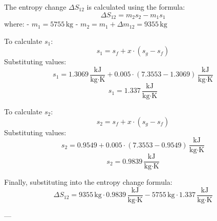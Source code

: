 The entropy change \( \Delta S_{12} \) is calculated using the formula:  
\[
\Delta S_{12} = m_{2} s_{2} - m_{1} s_{1}
\]  
where:  
- \( m_{1} = 5755 \, \text{kg} \)  
- \( m_{2} = m_{1} + \Delta m_{12} = 9355 \, \text{kg} \)  

To calculate \( s_{1} \):  
\[
s_{1} = s_f + x \cdot (s_g - s_f)
\]  
Substituting values:  
\[
s_{1} = 1.3069 \, \frac{\text{kJ}}{\text{kg·K}} + 0.005 \cdot (7.3553 - 1.3069) \, \frac{\text{kJ}}{\text{kg·K}}
\]  
\[
s_{1} = 1.337 \, \frac{\text{kJ}}{\text{kg·K}}
\]  

To calculate \( s_{2} \):  
\[
s_{2} = s_f + x \cdot (s_g - s_f)
\]  
Substituting values:  
\[
s_{2} = 0.9549 + 0.005 \cdot (7.3553 - 0.9549) \, \frac{\text{kJ}}{\text{kg·K}}
\]  
\[
s_{2} = 0.9839 \, \frac{\text{kJ}}{\text{kg·K}}
\]  

Finally, substituting into the entropy change formula:  
\[
\Delta S_{12} = 9355 \, \text{kg} \cdot 0.9839 \, \frac{\text{kJ}}{\text{kg·K}} - 5755 \, \text{kg} \cdot 1.337 \, \frac{\text{kJ}}{\text{kg·K}}
\]  

---